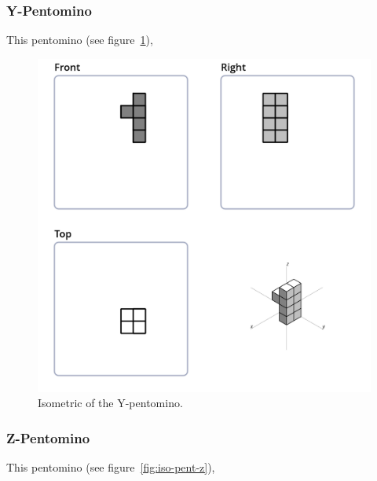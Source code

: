 \subsubsection{Y-Pentomino}
\label{sec:y-pentomino}
This pentomino (see figure~\ref{fig:iso-pent-y}),


\begin{figure}
	\centering
	\includegraphics[scale=0.3]{iso_diagrams/y.png}
	\caption{Isometric of the Y-pentomino.}
  \label{fig:iso-pent-y}
\end{figure}

\subsubsection{Z-Pentomino}
\label{sec:z-pentomino}
This pentomino (see figure~\ref{fig:iso-pent-z}),


